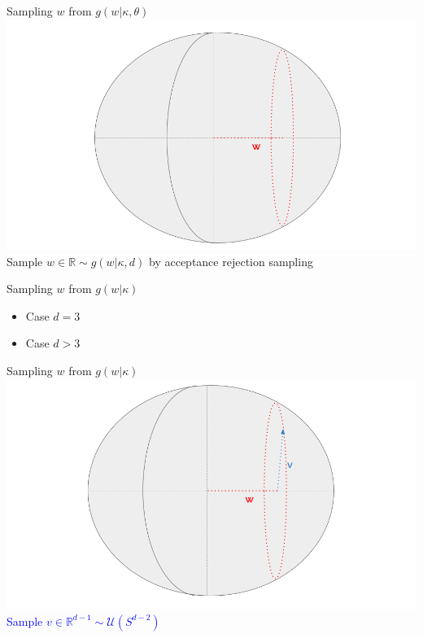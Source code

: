 \begin{frame}{Sampling $w$ from $g(w|\kappa, \theta)$}
  \centering
  \includegraphics[width=\textwidth]{figures/illustration_sampling_2.png}  
  Sample $w \in \mathbb{R} \sim g(w |\kappa, d)$ by acceptance rejection sampling
\end{frame}

\begin{frame}{Sampling $w$ from $g(w|\kappa)$}
  \begin{itemize}
    \item Case $d=3$
    \item Case $d>3$
  \end{itemize}
\end{frame}

\begin{frame}{Sampling $w$ from $g(w|\kappa)$}
  \centering
  \includegraphics[width=\textwidth]{figures/illustration_sampling_3.png}
  \textcolor{blue}{Sample $v \in \mathbb{R}^{d-1} \sim \mathcal{U}(S^{d-2})$}
\end{frame}

